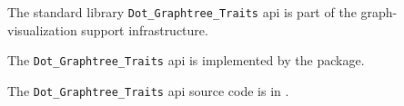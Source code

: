 
The standard library {\tt Dot\_Graphtree\_Traits} api is part of the graph-visualization support infrastructure.

The {\tt Dot\_Graphtree\_Traits} api is implemented by the  package.

The {\tt Dot\_Graphtree\_Traits} api source code is in .






